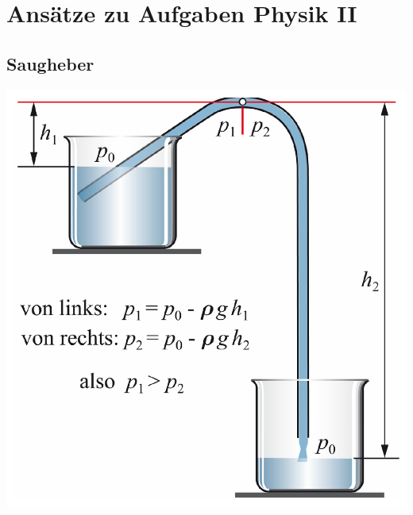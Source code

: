 \section{Ansätze zu Aufgaben Physik II}

\subsection{Saugheber}
\includegraphics[width=.65\linewidth]{Bilder/saugheber.png}

